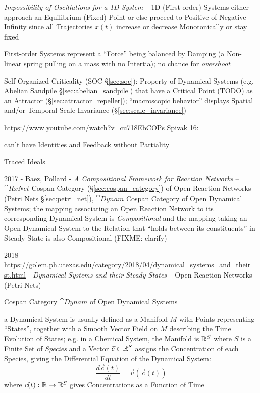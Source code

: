 \emph{Impossibility of Oscillations for a 1D System} -- 1D (First-order)
Systems either approach an Equilibrium (Fixed) Point or else proceed to
Positive of Negative Infinity since all Trajectories $x(t)$ increase or
decrease Monotonically or stay fixed

First-order Systems represent a ``Force'' being balanced by Damping (a
Non-linear spring pulling on a mass with no Intertia); no chance for
\emph{overshoot}

\asterism

\fist Self-Organized Criticality (SOC \S\ref{sec:soc}): Property of Dynamical
Systems (e.g. Abelian Sandpile \S\ref{sec:abelian_sandpile}) that have a
Critical Point (TODO) as an Attractor (\S\ref{sec:attractor_repeller});
``macroscopic behavior'' displays Spatial and/or Temporal Scale-Invariance
(\S\ref{sec:scale_invariance})

\asterism

\url{https://www.youtube.com/watch?v=cu718EbCOPs} Spivak 16:

can't have Identities and Feedback without Partiality %

Traced Ideals %

2017 - Baez, Pollard - \emph{A Compositional Framework for Reaction Networks}
-- $\cat{RxNet}$ Cospan Category (\S\ref{sec:cospan_category}) of Open Reaction
Networks (Petri Nets \S\ref{sec:petri_net}), $\cat{Dynam}$ Cospan Category of
Open Dynamical Systems; the mapping associating an Open Reaction Network to its
corresponding Dynamical System is \emph{Compositional} and the mapping taking
an Open Dynamical System to the Relation that ``holds between its
constituents'' in Steady State is also Compositional (FIXME: clarify)

2018 - \url{https://golem.ph.utexas.edu/category/2018/04/dynamical_systems_and_their_st.html} -
\emph{Dynamical Systems and their Steady States} -- Open Reaction Networks
(Petri Nets)

Cospan Category $\cat{Dynam}$ of Open Dynamical Systems

a Dynamical System is usually defined as a Manifold $M$ with Points
representing ``States'', together with a Smooth Vector Field on $M$ describing
the Time Evolution of States; e.g. in a Chemical System, the Manifold is
$\mathbb{R}^S$ where $S$ is a Finite Set of \emph{Species} and a Vector $\vec{c}
\in \mathbb{R}^S$ assigns the Concentration of each Species, giving the
Differential Equation of the Dynamical System:
\[
  \frac{d\vec{c}(t)}{dt} = \vec{v}(\vec{c}(t))
\]
where $\vec{c}(t) : \mathbb{R} \rightarrow \mathbb{R}^S$ gives Concentrations as a
Function of Time

